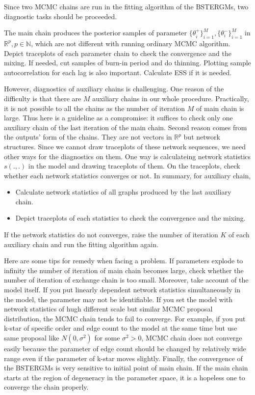 \documentclass[aspectratio=169,ignorenonframetext,9pt]{beamer}
\theoremstyle{plain}
\theoremstyle{definition}
\begin{document}
Since two MCMC chains are run in the fitting algorithm of the BSTERGMs, two diagnostic tasks should be proceeded.

The main chain produces the posterior samples of parameter
$\{\theta_i^+\}_{i=1}^M, \{\theta_i^-\}_{i=1}^M$ in $\mathbb{R}^p, p\in\mathbb{N}$,
which are not different with running ordinary MCMC algorithm.
Depict traceplots of each parameter chain to check the convergence and the mixing.
If needed, cut samples of burn-in period and do thinning.
Plotting sample autocorrelation for each lag is also important. Calculate ESS if it is needed.

However, diagnostics of auxiliary chains is challenging.
One reason of the difficulty is that there are $M$ auxiliary chains in our whole procedure.
Practically, it is not possible to all the chains as the number of iteration $M$ of main chain is large.
Thus here is a guideline as a compromise: it suffices to check only one auxiliary chain of the last iteration of the main chain.
Second reason comes from the outputs' form of the chains. They are not vectors in $\mathbb{R}^p$ but network structures. 
Since we cannot draw traceplots of these network sequences, we need other ways for the diagnostics on them.
One way is calculateing network statistics $s(.,.)$ in the model and drawing traceplots of them.
On the traceplots, check whether each network statistics converges or not.
In summary, for auxiliary chain,
\begin{itemize}
    \item Calculate network statistics of all graphs produced by the last auxiliary chain.
    \item Depict traceplots of each statistics to check the convergence and the mixing.
\end{itemize}
If the network statistics do not converges, raise the number of iteration $K$ of each auxiliary chain and
run the fitting algorithm again.

Here are some tips for remedy when facing a problem.
If parameters explode to infinity the number of iteration of main chain becomes large,
check whether the number of iteration of exchange chain is too small.
Moreover, take account of the model itself. 
If you put linearly dependent network statistics simultaneously in the model,
the parameter may not be identifiable. If you set the model with network statistics of hugh different scale but
similar MCMC proposal distribution, the MCMC chain tends to fail to converge. For example,
if you put k-star of specific order and edge count to the model at the same time but use
same proposal like $N(0,\sigma^2)$ for some $\sigma^2>0$, MCMC chain does not converge easily
because the parameter of edge count should be changed by relatively wide range even if the parameter of k-star moves slightly.
Finally, the convergence of the BSTERGMs is very sensitive to initial point of main chain.
If the main chain starts at the region of degeneracy in the parameter space, it is a hopeless one to converge the chain properly.
\end{document}
